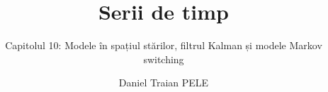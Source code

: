 \title[Serii de timp]{Serii de timp}
\subtitle{Capitolul 10: Modele în spațiul stărilor, filtrul Kalman și modele Markov switching}
\author[D.T. Pele]{Daniel Traian PELE}
\date{}

\providecommand{\tsaapplink}[3]{\hypertarget{#2}{}\hyperlink{#1}{\beamergotobutton{#3}}}  %
\providecommand{\tsaappback}[2]{\begin{tikzpicture}[remember picture,overlay]\node[anchor=south east] at ([xshift=-3mm,yshift=7mm]current page.south east){\hyperlink{#1}{\beamerreturnbutton{#2}}};\end{tikzpicture}}  %
\providecommand{\tsachlink}[2]{\href{#1}{#2}}  %
\providecommand{\tsachlinkt}[2]{\href{#1}{\usebeamercolor[fg]{frametitle}#2}}  %


